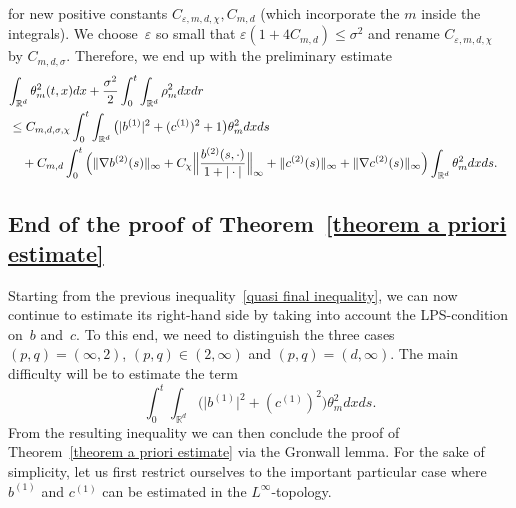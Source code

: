 \documentclass[a4paper,10pt]{article}
\newcommand\1{\mathbbm{1}}
\newcommand{\eps}{\varepsilon}
\numberwithin{equation}{section}
\begin{document}
for new positive constants $C_{\eps,m,d,\chi},C_{m,d}$ (which incorporate the $m$ inside the integrals). We choose~$\eps$ so small
that $\eps(1+4C_{m,d})  \leq\sigma^{2}$ and rename $C_{\eps,m,d,\chi}$ by $C_{m,d,\sigma}$. Therefore, we end up with the preliminary estimate
\begin{align}
\label{quasi final inequality}
\lefteqn{ \int_{\mathbb{R}^{d}}\theta_{m}^{2}(t,x)dx+\frac{\sigma^{2}}{2}\int_{0} 
^{t}\int_{\mathbb{R}^{d}}\rho_{m}^{2}dxdr } \\
&  \leq C_{m,d,\sigma,\chi} \int_{0}^{t} \int_{\mathbb{R}^{d}} \big(\vert b^{(1)}\vert ^{2}+(c^{(1)})^{2} +1\big) \theta_{m}^{2} dxds \nonumber \\& \quad {} +C_{m,d} \int_{0}^{t} \Big( \Vert \nabla b^{(2)}(s)  \Vert _{\infty}+C_{\chi} \Big\Vert \frac{b^{(2)}(s,\cdot)}{1+\vert \cdot\vert } \Big\Vert_{\infty}+ \Vert c^{(2)}(s)  \Vert _{\infty}+\Vert \nabla c^{(2)}(s) \Vert_{\infty} \Big) \int_{\mathbb{R}^{d}} \theta_{m}^{2} dxds . \nonumber
\end{align}

\subsection{End of the proof of Theorem~\ref{theorem a priori estimate}}

Starting from the previous inequality~\eqref{quasi final inequality}, we can now continue to estimate its right-hand side by taking into account the LPS-condition on~$b$ and~$c$. To this end, we need to distinguish the three cases $(p,q)=(\infty,2)$, $(p,q) \in (2,\infty)$ and $(p,q) =(d,\infty)$. The main difficulty will be to estimate the term
\begin{equation*}
\int_{0}^{t} \int_{\mathbb{R}^{d}} \big(\vert b^{(1)}\vert ^{2}+(c^{(1)})^{2} \big) \theta_{m}^{2} dxds .
\end{equation*}
From the resulting inequality we can then conclude the proof of Theorem~\ref{theorem a priori estimate} via the Gronwall lemma. For the sake of simplicity, let us first restrict ourselves to the important particular case where $b^{(1)}$ and $c^{(1)}$ can be estimated in the $L^{\infty}$-topology.
\end{document}
